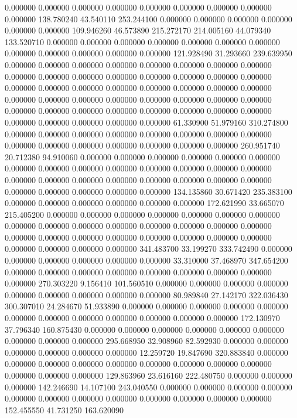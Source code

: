 0.000000 0.000000 0.000000
0.000000 0.000000 0.000000
0.000000 0.000000 0.000000
138.780240 43.540110 253.244100
0.000000 0.000000 0.000000
0.000000 0.000000 0.000000
109.946260 46.573890 215.272170
214.005160 44.079340 133.520710
0.000000 0.000000 0.000000
0.000000 0.000000 0.000000
0.000000 0.000000 0.000000
0.000000 0.000000 0.000000
121.928490 31.293660 239.639950
0.000000 0.000000 0.000000
0.000000 0.000000 0.000000
0.000000 0.000000 0.000000
0.000000 0.000000 0.000000
0.000000 0.000000 0.000000
0.000000 0.000000 0.000000
0.000000 0.000000 0.000000
0.000000 0.000000 0.000000
0.000000 0.000000 0.000000
0.000000 0.000000 0.000000
0.000000 0.000000 0.000000
0.000000 0.000000 0.000000
0.000000 0.000000 0.000000
0.000000 0.000000 0.000000
0.000000 0.000000 0.000000
61.330900 51.979160 310.274800
0.000000 0.000000 0.000000
0.000000 0.000000 0.000000
0.000000 0.000000 0.000000
0.000000 0.000000 0.000000
0.000000 0.000000 0.000000
260.951740 20.712380 94.910060
0.000000 0.000000 0.000000
0.000000 0.000000 0.000000
0.000000 0.000000 0.000000
0.000000 0.000000 0.000000
0.000000 0.000000 0.000000
0.000000 0.000000 0.000000
0.000000 0.000000 0.000000
0.000000 0.000000 0.000000
0.000000 0.000000 0.000000
134.135860 30.671420 235.383100
0.000000 0.000000 0.000000
0.000000 0.000000 0.000000
172.621990 33.665070 215.405200
0.000000 0.000000 0.000000
0.000000 0.000000 0.000000
0.000000 0.000000 0.000000
0.000000 0.000000 0.000000
0.000000 0.000000 0.000000
0.000000 0.000000 0.000000
0.000000 0.000000 0.000000
0.000000 0.000000 0.000000
0.000000 0.000000 0.000000
341.483700 33.199270 333.742490
0.000000 0.000000 0.000000
0.000000 0.000000 0.000000
33.310000 37.468970 347.654200
0.000000 0.000000 0.000000
0.000000 0.000000 0.000000
0.000000 0.000000 0.000000
270.303220 9.156410 101.560510
0.000000 0.000000 0.000000
0.000000 0.000000 0.000000
0.000000 0.000000 0.000000
80.989840 27.142170 322.036430
300.307010 24.284670 51.933890
0.000000 0.000000 0.000000
0.000000 0.000000 0.000000
0.000000 0.000000 0.000000
0.000000 0.000000 0.000000
172.130970 37.796340 160.875430
0.000000 0.000000 0.000000
0.000000 0.000000 0.000000
0.000000 0.000000 0.000000
295.668950 32.908960 82.592930
0.000000 0.000000 0.000000
0.000000 0.000000 0.000000
12.259720 19.847690 320.883840
0.000000 0.000000 0.000000
0.000000 0.000000 0.000000
0.000000 0.000000 0.000000
0.000000 0.000000 0.000000
129.863960 23.616160 222.480750
0.000000 0.000000 0.000000
142.246690 14.107100 243.040550
0.000000 0.000000 0.000000
0.000000 0.000000 0.000000
0.000000 0.000000 0.000000
0.000000 0.000000 0.000000
152.455550 41.731250 163.620090
